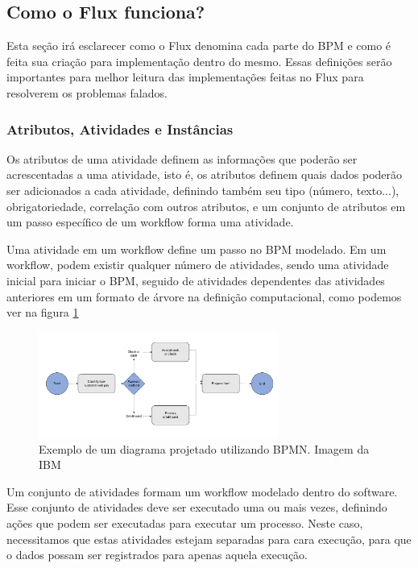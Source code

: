 \subsection{Como o Flux funciona?}

Esta seção irá esclarecer como o Flux denomina cada parte do BPM e como é feita sua criação para implementação dentro do mesmo. Essas definições serão importantes para melhor leitura das implementações feitas no Flux para resolverem os problemas falados.

\subsubsection{Atributos, Atividades e Instâncias}

Os atributos de uma atividade definem as informações que poderão ser acrescentadas a uma atividade, isto é, os atributos definem quais dados poderão ser adicionados a cada atividade, definindo também seu tipo (número, texto...), obrigatoriedade, correlação com outros atributos, e um conjunto de atributos em um passo específico de um workflow forma uma atividade.

Uma atividade em um workflow define um passo no BPM modelado. Em um workflow, podem existir qualquer número de atividades, sendo uma atividade inicial para iniciar o BPM, seguido de atividades dependentes das atividades anteriores em um formato de árvore na definição computacional, como podemos ver na figura \ref{fig:bpmn_diagram}

\begin{figure}
    \centering
    \includegraphics[width=0.7\textwidth]{imgs/BPM/bpmn_diagram.png}
    \caption{Exemplo de um diagrama projetado utilizando BPMN. Imagem da IBM \cite{TheIBM}}
    \label{fig:bpmn_diagram}
\end{figure}

Um conjunto de atividades formam um workflow modelado dentro do software. Esse conjunto de atividades deve ser executado uma ou mais vezes, definindo ações que podem ser executadas para executar um processo. Neste caso, necessitamos que estas atividades estejam separadas para cara execução, para que o dados possam ser registrados para apenas aquela execução.

